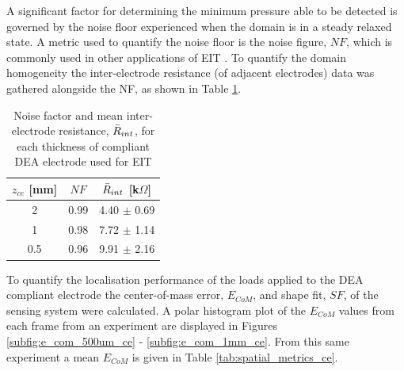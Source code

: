 A significant factor for determining the minimum pressure able to be detected is governed by the noise floor experienced when the domain is in a steady relaxed state. A metric used to quantify the noise floor is the noise figure, $N\!F$, which is commonly used in other applications of EIT\cite{Adler2009, Ellingham2024} . To quantify the domain homogeneity the inter-electrode resistance (of adjacent electrodes) data was gathered alongside the NF, as shown in Table \ref{tab:NF_vals}.
\begin{table}[H]
	\centering
	\caption{Noise factor and mean inter-electrode resistance, $\Bar{R}_{int}$, for each thickness of compliant DEA electrode used for EIT}
	\label{tab:NF_vals}
	\begin{tabular}{c|c|c}
		$z_{ce}$ [mm] & $N\!F$ & $\Bar{R}_{int}$ [k$\Omega$]\\
		\hline
		2 & 0.99 & 4.40 $\pm$ 0.69 \\
		1 & 0.98 & 7.72 $\pm$ 1.14\\
		0.5 & 0.96 & 9.91 $\pm$ 2.16\\
	\end{tabular}
\end{table}
To quantify the localisation performance of the loads applied to the DEA compliant electrode the center-of-mass error, $E_{CoM}$, and shape fit, $S\!F$, of the sensing system were calculated.	A polar histogram plot of the $E_{CoM}$ values from each frame from an experiment are displayed in Figures \ref{subfig:e_com_500um_ce} - \ref{subfig:e_com_1mm_ce}. From this same experiment a mean $E_{CoM}$ is given in Table \ref{tab:spatial_metrics_ce}.

